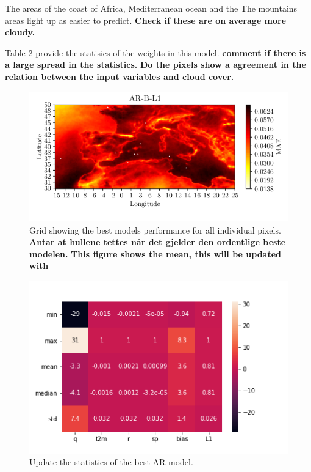 The areas of the coast of Africa, Mediterranean ocean and the
The mountains areas light up as easier to predict. \textbf{Check if these are on average more cloudy.}

Table \ref{tab:weights_best_model} provide the statisics of the weights in this model. \textbf{comment if there is a large spread in the statistics.} \textbf{Do the pixels show a agreement in the relation between the input variables and cloud cover.}
\begin{figure}
    \centering
    \includegraphics{python_figs/mea_best_ar_model_tcc.png}
    \caption{Grid showing the best models performance for all individual pixels. \textbf{Antar at hullene tettes når det gjelder den ordentlige beste modelen.} \textbf{This figure shows the mean, this will be updated with }}
    \label{fig:grid_mse_best_model}
\end{figure}

\begin{figure}
    \centering
    \includegraphics{python_figs/test_weights_heatmap.png}
    \caption{Update the statistics of the best AR-model.}
    \label{tab:weights_best_model}
\end{figure}

